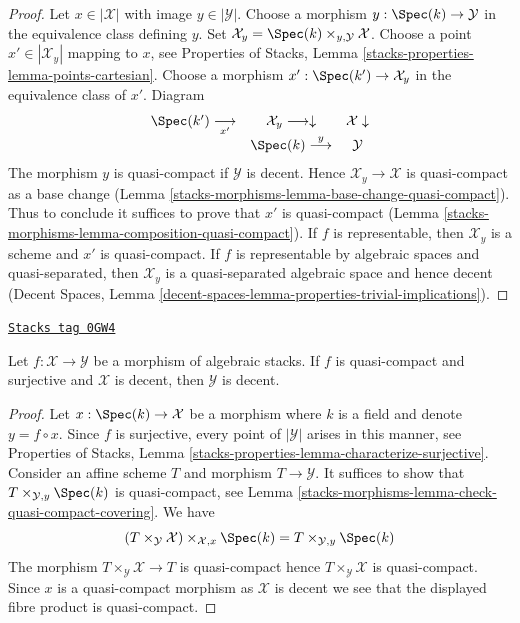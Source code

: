 \begin{proof}
Let $x \in |\mathcal{X}|$ with image $y \in |\mathcal{Y}|$.
Choose a morphism $y : \Spec(k) \to \mathcal{Y}$
in the equivalence class defining $y$.
Set $\mathcal{X}_y = \Spec(k) \times_{y, \mathcal{Y}} \mathcal{X}$.
Choose a point $x' \in |\mathcal{X}_y|$ mapping to $x$, see
Properties of Stacks, Lemma \ref{stacks-properties-lemma-points-cartesian}.
Choose a morphism $x' : \Spec(k') \to \mathcal{X}_y$ in the equivalence
class of $x'$. Diagram
$$
\begin{array}{ccc}\Spec(k') \underset{x'}{\longrightarrow} & \mathcal{X}_y \longrightarrow\downarrow & \mathcal{X} \downarrow \\  & \Spec(k) \overset{y}{\longrightarrow} & \mathcal{Y}\end{array}
$$
The morphism $y$ is quasi-compact if $\mathcal{Y}$ is decent.
Hence $\mathcal{X}_y \to \mathcal{X}$ is quasi-compact as a base change
(Lemma \ref{stacks-morphisms-lemma-base-change-quasi-compact}).
Thus to conclude it suffices to prove that $x'$ is quasi-compact
(Lemma \ref{stacks-morphisms-lemma-composition-quasi-compact}).
If $f$ is representable, then $\mathcal{X}_y$ is a scheme
and $x'$ is quasi-compact.
If $f$ is representable by algebraic spaces and quasi-separated,
then $\mathcal{X}_y$ is a quasi-separated algebraic space
and hence decent (Decent Spaces, Lemma
\ref{decent-spaces-lemma-properties-trivial-implications}).
\end{proof}

\begin{lemma}[Qc decent]
\label{stacks-morphisms-lemma-qc-decent}
\href{https://stacks.math.columbia.edu/tag/0GW4}{\texttt{Stacks tag 0GW4}}

Let $f : \mathcal{X} \to \mathcal{Y}$ be a morphism of algebraic stacks.
If $f$ is quasi-compact and surjective and $\mathcal{X}$ is decent,
then $\mathcal{Y}$ is decent.
\end{lemma}

\begin{proof}
Let $x : \Spec(k) \to \mathcal{X}$ be a morphism where $k$ is a field
and denote $y = f \circ x$. Since $f$ is surjective, every point
of $|\mathcal{Y}|$ arises in this manner, see Properties of Stacks,
Lemma \ref{stacks-properties-lemma-characterize-surjective}.
Consider an affine scheme $T$ and morphism
$T \to \mathcal{Y}$. It suffices to show that
$T \times_{\mathcal{Y}, y} \Spec(k)$ is quasi-compact, see
Lemma \ref{stacks-morphisms-lemma-check-quasi-compact-covering}.
We have
$$
(T \times_{\mathcal{Y}} \mathcal{X}) \times_{\mathcal{X}, x} \Spec(k) =
T \times_{\mathcal{Y}, y} \Spec(k)
$$
The morphism $T \times_{\mathcal{Y}} \mathcal{X} \to T$ is quasi-compact
hence $T \times_\mathcal{Y} \mathcal{X}$ is quasi-compact. Since $x$ is
a quasi-compact morphism as $\mathcal{X}$ is decent
we see that the displayed fibre product is quasi-compact.
\end{proof}

